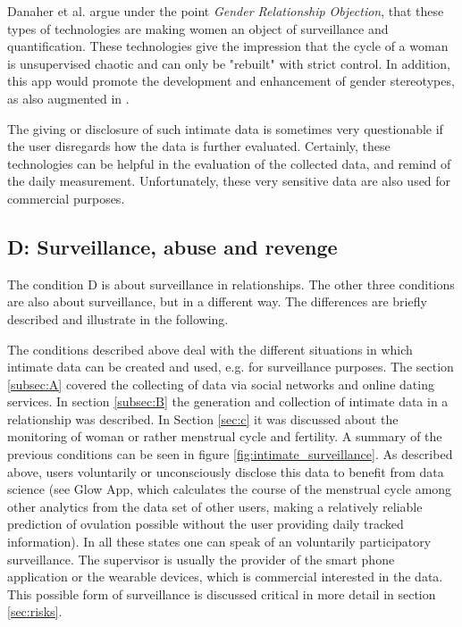 Danaher et al. \cite{doi:10.1080/15265161.2017.1409823} argue under the point \textit{Gender Relationship Objection}, that these types of technologies are making women an object of surveillance and quantification. 
These technologies give the impression that the cycle of a woman is unsupervised chaotic and can only be "rebuilt" with strict control.
In addition, this app would promote the development and enhancement of gender stereotypes, as also augmented in \cite{doi:10.1080/13691058.2014.920528}.
 
The giving or disclosure of such intimate data is sometimes very questionable if the user disregards how the data is further evaluated. Certainly, these technologies can be helpful in the evaluation of the collected data, and remind of the daily measurement. Unfortunately, these very sensitive data are also used for commercial purposes.

\subsection{D: Surveillance, abuse and revenge}
The condition D is about surveillance in relationships. The other three conditions are also about surveillance, but in a different way. The differences are briefly described and illustrate in the following.
 
The conditions described above deal with the different situations in which intimate data can be created and used, e.g. for surveillance purposes.
The section \ref{subsec:A} covered the collecting of data via social networks and online dating services. In section \ref{subsec:B} the generation and collection of intimate data in a relationship was described. In Section \ref{sec:c} it was discussed about the monitoring of woman or rather menstrual cycle and fertility.
A summary of the previous conditions can be seen in figure \ref{fig:intimate_surveillance}.
As described above, users voluntarily or unconsciously disclose this data to benefit from data science (see Glow App, which calculates the course of the menstrual cycle among other analytics from the data set of other users, making a relatively reliable prediction of ovulation possible without the user providing daily tracked information).
In all these states one can speak of an voluntarily participatory surveillance.
The supervisor is usually the provider of the smart phone application or the wearable devices, which is commercial interested in the data. This possible form of surveillance is discussed critical in more detail in section \ref{sec:risks}.


